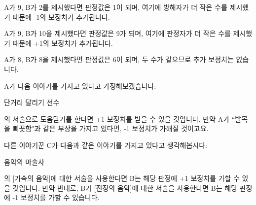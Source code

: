 \documentclass{report}
\begin{document}
	A가 9, B가 2를 제시했다면 판정값은 1이 되며, 여기에 방해자가 더 작은 수를 제시했기 때문에 -1의 보정치가 추가됩니다.
	
	A가 9, B가 10을 제시했다면 판정값은 9가 되며, 여기에 판정자가 더 작은 수를 제시했기 때문에 +1의 보정치가 추가됩니다.
	
	A가 8, B가 8을 제시했다면 판정값은 6이 되며, 두 수가 같으므로 추가 보정치는 없습니다.
	
	A가 다음 이야기를 가지고 있다고 가정해보겠습니다:
	\begin{lite}[runner]{단거리 달리기 선수}
	\end{lite}
	
	의 서술으로 도움닫기를 한다면 +1 보정치를 받을 수 있을 것입니다. 만약 A가 ``발목을 삐끗함"과 같은 부상을 가지고 있다면, -1 보정치가 가해질 것이고요.
	
	다른 이야기꾼 C가 다음과 같은 이야기를 가지고 있다고 생각해봅시다:
	\begin{lite}{음악의 마술사}
		
	\end{lite}
	
	의 [가속의 음악]에 대한 서술을 사용한다면 B는 해당 판정에 +1 보정치를 가할 수 있을 것입니다. 만약 반대로, B가 [진정의 음악]에 대한 서술을 사용한다면 B는 해당 판정에 -1 보정치를 가할 수 있습니다.
\end{document}
